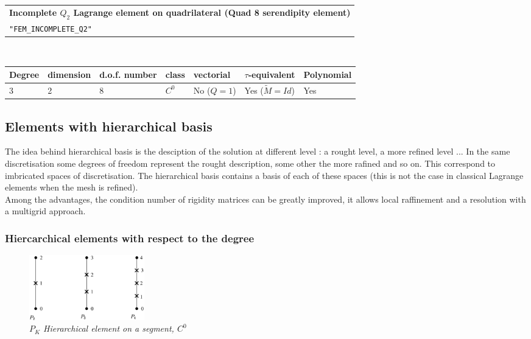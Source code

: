 \documentclass[10pt,a4paper]{article}
\begin{document}
\begin{center}
\begin{tabular}{|m{16.109cm}|} \hline 
{\bf Incomplete $Q_2$ Lagrange element on quadrilateral (Quad 8 serendipity element)}\\
{\tt "FEM\_INCOMPLETE\_Q2"} 
\end{tabular} \\ \vspace{-1pt} 
\begin{tabular}{|m{2cm}|m{2cm}|m{2.5cm}|m{1.5cm}|m{1.5cm}|m{2cm}|m{2cm}|} \hline 
Degree & dimension & d.o.f. number & class & vectorial & \mbox{$\tau$-equivalent} & Polynomial \\ \hline
\small $3$ & 2 & 8 & $C^0$ & No \mbox{($Q = 1$)} & Yes \mbox{($\tilde{M} = Id$)}  & Yes \\ \hline
\end{tabular}
\end{center}

\subsection{Elements with hierarchical basis}

The idea behind hierarchical basis is the desciption of the solution at different level : a rought level, a more refined level ... In the same discretisation some degrees of freedom represent the rought description, some other the more rafined and so on. This correspond to imbricated spaces of discretisation. The hierarchical basis contains a basis of each of these spaces (this is not the case in classical Lagrange elements when the mesh is refined).\\[0.5cm]
Among the advantages, the condition number of  rigidity matrices can be greatly improved, it allows local raffinement and a resolution with a multigrid approach.


\subsubsection{Hiercarchical elements with respect to the degree}

\begin{figure}[H]
  \begin{center}
    \includegraphics[width=5cm,angle=0]{getfemlist_segment_hier.eps}
  \end{center}
  \caption{ \it $P_K$ Hierarchical element on a segment, $C^0$} 
  \label{fig:seg_hier}
\end{figure}
\end{document}
